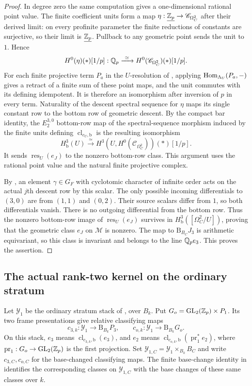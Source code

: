 \begin{proof}
In degree zero the same computation gives a one-dimensional rational
point value.  The finite coefficient units form a map
$\eta:\underline{\mathbb Z_p}\to\mathscr C_{\Omega_C^2}$ after their derived
limit: on every profinite parameter the finite reductions of constants
are surjective, so their limit is $\underline{\mathbb Z_p}$.
Pullback to any geometric point sends the unit to $1$.  Hence
\[
 H^0(\eta)(*)[1/p]:\mathbb Q_p
       \xrightarrow{\ \simeq\ }
 H^0(\mathscr C_{\Omega_C^2})(*)[1/p].
\]
For each finite projective term $P_a$ in the $U$-resolution of
, applying $\operatorname{Hom}_{\Lambda_U}(P_a,-)$
gives a retract of a finite sum of these point maps, and the unit
commutes with its defining idempotent.  It is therefore an isomorphism
after inversion of $p$ in every term.  Naturality of the descent
spectral sequence for $\eta$ maps its single constant row to the
bottom row of geometric descent.  By the compact bar identity, the
$E_2^{3,0}$ bottom-row map of
the spectral-sequence morphism induced by the finite units defining
$\operatorname{cl}_{c_U,\mathrm b}$ is the resulting isomorphism
\[
 H^3_{\mathrm b}(U)
       \xrightarrow{\ \simeq\ }
 H^3(U,H^0(\mathscr C_{\Omega_C^2}))(*)[1/p].
\]
It sends $\operatorname{res}_U(e_J)$ to the
nonzero bottom-row class.  This argument uses the rational point
value and the natural finite projective complex.

By , an element
$\gamma\in G_F$ with cyclotomic character of infinite order
acts on the actual $j$th descent row by this scalar.  The only
possible incoming differentials to $(3,0)$ are from $(1,1)$
and $(0,2)$.  Their source scalars differ from $1$, so both
differentials vanish.  There is no outgoing differential from
the bottom row.  Thus the nonzero bottom-row image of
$\operatorname{res}_U(e_J)$ survives in
$H^3_{\mathrm b}([\Omega_C^2/U])$, proving that the geometric class
$e_J$ on $\mathcal M$ is nonzero.  The map to $\mathrm B_{B_C}J_3$ is
arithmetic equivariant, so this class is invariant and belongs
to the line $\mathbb Q_p e_3$.  This proves the assertion.
\end{proof}

\subsection{The actual rank-two kernel on the ordinary stratum}

Let $\mathcal Y_1$ be the ordinary stratum stack of
, over $B_k$.  Put
$G_o=\operatorname{GL}_2(\mathbb Z_p)\times P_1$.  Its two frame presentations give
relative classifying maps
\[
 c_{3,k}:\mathcal Y_1\longrightarrow\mathrm B_{B_k}P_3,
 \qquad c_{o,k}:\mathcal Y_1\longrightarrow\mathrm B_{B_k}G_o.
\]
On this stack, $e_3$ means $\operatorname{cl}_{c_{3,k},\mathrm b}(e_3)$,
and $e_2$ means
$\operatorname{cl}_{c_{o,k},\mathrm b}(\operatorname{pr}_1^*e_2)$,
where $\operatorname{pr}_1:G_o\to\operatorname{GL}_2(\mathbb Z_p)$ is the first projection.
Set $\mathcal Y_{1,C}=\mathcal Y_1\times_{B_k}B_C$ and write
$c_{3,C},c_{o,C}$ for the base-changed classifying maps.  The finite
base-change identity in  identifies
the corresponding classes on $\mathcal Y_{1,C}$ with the base changes
of these same classes over $k$.

